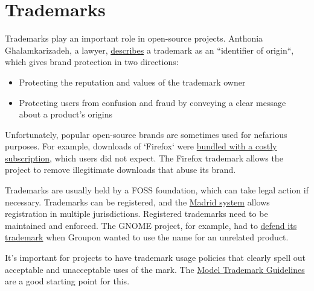 


\chapter{Trademarks}

Trademarks play an important role in open-source projects.  Anthonia Ghalamkarizadeh, a lawyer, \href{https://lwn.net/Articles/546678/}{describes} a trademark as an ``identifier of origin``, which gives brand protection in two directions:

\begin{itemize}

\itemsep 0.50em

\item Protecting the reputation and values of the trademark owner

\item Protecting users from confusion and fraud by conveying a clear message about a product's origins

\end{itemize}

Unfortunately, popular open-source brands are sometimes used for nefarious purposes.  For example, downloads of `Firefox` were \href{https://lwn.net/Articles/546678/}{bundled with a costly subscription}, which users did not expect.  The Firefox trademark allows the project to remove illegitimate downloads that abuse its brand.

Trademarks are usually held by a FOSS foundation, which can take legal action if necessary.  Trademarks can be registered, and the \href{https://en.wikipedia.org/wiki/Madrid_system}{Madrid system} allows registration in multiple jurisdictions.  Registered trademarks need to be maintained and enforced.  The GNOME project, for example, had to \href{https://lwn.net/Articles/654124/}{defend its trademark} when Groupon wanted to use the name for an unrelated product.

It's important for projects to have trademark usage policies that clearly spell out acceptable and unacceptable uses of the mark.  The \href{http://modeltrademarkguidelines.org/}{Model Trademark Guidelines} are a good starting point for this.

\newpage

